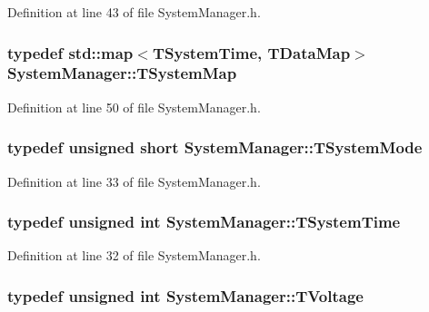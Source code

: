 Definition at line 43 of file System\-Manager.\-h.

\hypertarget{class_system_manager_aae66953e62823ae14519c7e9b3925864}{
\subsubsection[{T\-System\-Map}]{\setlength{\rightskip}{0pt plus 5cm}typedef std\-::map$<${\bf T\-System\-Time}, {\bf T\-Data\-Map}$>$ {\bf System\-Manager\-::\-T\-System\-Map}\hspace{0.3cm}{\ttfamily [private]}}}\label{class_system_manager_aae66953e62823ae14519c7e9b3925864}


Definition at line 50 of file System\-Manager.\-h.

\hypertarget{class_system_manager_aa32b3f50b8882c8aa7a9ca88ab7a43dd}{
\subsubsection[{T\-System\-Mode}]{\setlength{\rightskip}{0pt plus 5cm}typedef unsigned short {\bf System\-Manager\-::\-T\-System\-Mode}}}\label{class_system_manager_aa32b3f50b8882c8aa7a9ca88ab7a43dd}


Definition at line 33 of file System\-Manager.\-h.

\hypertarget{class_system_manager_a9743ff4f23e7d957f5932780d8070099}{
\subsubsection[{T\-System\-Time}]{\setlength{\rightskip}{0pt plus 5cm}typedef unsigned int {\bf System\-Manager\-::\-T\-System\-Time}}}\label{class_system_manager_a9743ff4f23e7d957f5932780d8070099}


Definition at line 32 of file System\-Manager.\-h.

\hypertarget{class_system_manager_ad7c10914fe99b3f09350a10028f25300}{
\subsubsection[{T\-Voltage}]{\setlength{\rightskip}{0pt plus 5cm}typedef unsigned int {\bf System\-Manager\-::\-T\-Voltage}}}\label{class_system_manager_ad7c10914fe99b3f09350a10028f25300}


